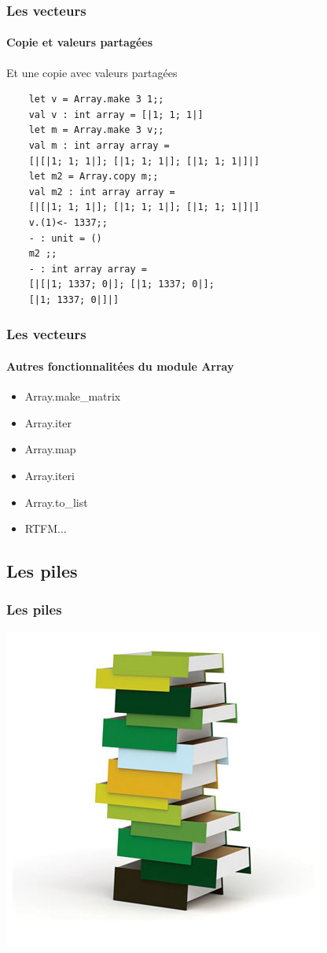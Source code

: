 \begin{frame}[fragile]
	\frametitle{Les vecteurs}
	\framesubtitle{Copie et valeurs partagées}
	\begin{block}{Et une copie avec valeurs partagées}
	\begin{lstlisting}
	let v = Array.make 3 1;;
	val v : int array = [|1; 1; 1|]
	let m = Array.make 3 v;;
	val m : int array array = 
	[|[|1; 1; 1|]; [|1; 1; 1|]; [|1; 1; 1|]|]
	let m2 = Array.copy m;;
	val m2 : int array array = 
	[|[|1; 1; 1|]; [|1; 1; 1|]; [|1; 1; 1|]|]
	v.(1)<- 1337;;
	- : unit = ()
	m2 ;;
	- : int array array = 
	[|[|1; 1337; 0|]; [|1; 1337; 0|]; 
	[|1; 1337; 0|]|]
	\end{lstlisting}
	\end{block}
\end{frame}


\begin{frame}[fragile]
	\frametitle{Les vecteurs}
	\framesubtitle{Autres fonctionnalitées du module Array}
	\begin{itemize}
	\item Array.make\_matrix
	
	\item Array.iter

	\item Array.map 

	\item Array.iteri

	\item Array.to\_list

	\item RTFM...

	\end{itemize}
\end{frame}

\subsection{Les piles}
\begin{frame}
	\frametitle{Les piles}
	\includegraphics[scale=0.4]{pics/stack.jpg}
\end{frame}

